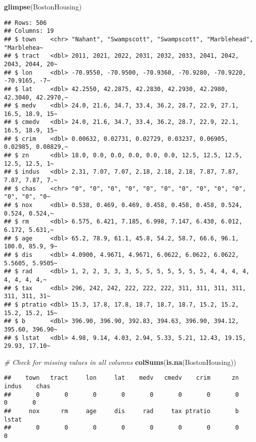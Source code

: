 \documentclass[
]{book}
\newenvironment{Shaded}{\begin{snugshade}}{\end{snugshade}}
\newcommand{\CommentTok}[1]{\textcolor[rgb]{0.56,0.35,0.01}{\textit{#1}}}
\newcommand{\FunctionTok}[1]{\textcolor[rgb]{0.13,0.29,0.53}{\textbf{#1}}}
\newcommand{\NormalTok}[1]{#1}
\begin{document}
\begin{Shaded}
\begin{Highlighting}[]
\FunctionTok{glimpse}\NormalTok{(BostonHousing)}
\end{Highlighting}
\end{Shaded}

\begin{verbatim}
## Rows: 506
## Columns: 19
## $ town    <chr> "Nahant", "Swampscott", "Swampscott", "Marblehead", "Marblehea~
## $ tract   <dbl> 2011, 2021, 2022, 2031, 2032, 2033, 2041, 2042, 2043, 2044, 20~
## $ lon     <dbl> -70.9550, -70.9500, -70.9360, -70.9280, -70.9220, -70.9165, -7~
## $ lat     <dbl> 42.2550, 42.2875, 42.2830, 42.2930, 42.2980, 42.3040, 42.2970,~
## $ medv    <dbl> 24.0, 21.6, 34.7, 33.4, 36.2, 28.7, 22.9, 27.1, 16.5, 18.9, 15~
## $ cmedv   <dbl> 24.0, 21.6, 34.7, 33.4, 36.2, 28.7, 22.9, 22.1, 16.5, 18.9, 15~
## $ crim    <dbl> 0.00632, 0.02731, 0.02729, 0.03237, 0.06905, 0.02985, 0.08829,~
## $ zn      <dbl> 18.0, 0.0, 0.0, 0.0, 0.0, 0.0, 12.5, 12.5, 12.5, 12.5, 12.5, 1~
## $ indus   <dbl> 2.31, 7.07, 7.07, 2.18, 2.18, 2.18, 7.87, 7.87, 7.87, 7.87, 7.~
## $ chas    <chr> "0", "0", "0", "0", "0", "0", "0", "0", "0", "0", "0", "0", "0~
## $ nox     <dbl> 0.538, 0.469, 0.469, 0.458, 0.458, 0.458, 0.524, 0.524, 0.524,~
## $ rm      <dbl> 6.575, 6.421, 7.185, 6.998, 7.147, 6.430, 6.012, 6.172, 5.631,~
## $ age     <dbl> 65.2, 78.9, 61.1, 45.8, 54.2, 58.7, 66.6, 96.1, 100.0, 85.9, 9~
## $ dis     <dbl> 4.0900, 4.9671, 4.9671, 6.0622, 6.0622, 6.0622, 5.5605, 5.9505~
## $ rad     <dbl> 1, 2, 2, 3, 3, 3, 5, 5, 5, 5, 5, 5, 5, 4, 4, 4, 4, 4, 4, 4, 4,~
## $ tax     <dbl> 296, 242, 242, 222, 222, 222, 311, 311, 311, 311, 311, 311, 31~
## $ ptratio <dbl> 15.3, 17.8, 17.8, 18.7, 18.7, 18.7, 15.2, 15.2, 15.2, 15.2, 15~
## $ b       <dbl> 396.90, 396.90, 392.83, 394.63, 396.90, 394.12, 395.60, 396.90~
## $ lstat   <dbl> 4.98, 9.14, 4.03, 2.94, 5.33, 5.21, 12.43, 19.15, 29.93, 17.10~
\end{verbatim}

\begin{Shaded}
\begin{Highlighting}[]
\CommentTok{\# Check for missing values in all columns}
\FunctionTok{colSums}\NormalTok{(}\FunctionTok{is.na}\NormalTok{(BostonHousing))}
\end{Highlighting}
\end{Shaded}

\begin{verbatim}
##    town   tract     lon     lat    medv   cmedv    crim      zn   indus    chas 
##       0       0       0       0       0       0       0       0       0       0 
##     nox      rm     age     dis     rad     tax ptratio       b   lstat 
##       0       0       0       0       0       0       0       0       0
\end{verbatim}
\end{document}
